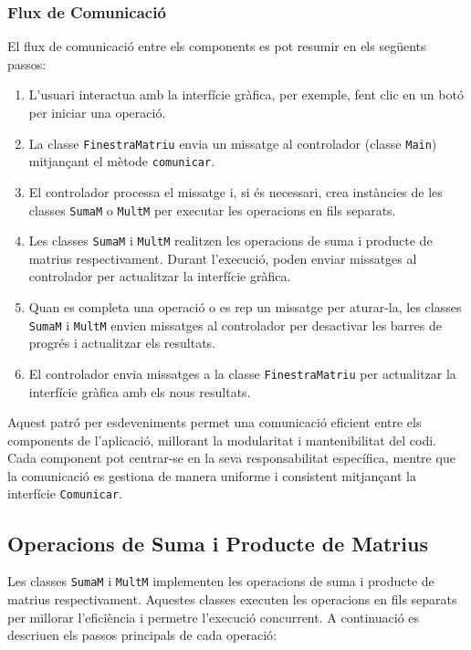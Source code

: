 \documentclass{ieeetj}
\begin{document}
\subsubsection{Flux de Comunicació}
El flux de comunicació entre els components es pot resumir en els següents passos:

\begin{enumerate}
    \item L'usuari interactua amb la interfície gràfica, per exemple, fent clic en un botó per iniciar una operació.
    \item La classe \texttt{FinestraMatriu} envia un missatge al controlador (classe \texttt{Main}) mitjançant el mètode \texttt{comunicar}.
    \item El controlador processa el missatge i, si és necessari, crea instàncies de les classes \texttt{SumaM} o \texttt{MultM} per executar les operacions en fils separats.
    \item Les classes \texttt{SumaM} i \texttt{MultM} realitzen les operacions de suma i producte de matrius respectivament. Durant l'execució, poden enviar missatges al controlador per actualitzar la interfície gràfica.
    \item Quan es completa una operació o es rep un missatge per aturar-la, les classes \texttt{SumaM} i \texttt{MultM} envien missatges al controlador per desactivar les barres de progrés i actualitzar els resultats.
    \item El controlador envia missatges a la classe \texttt{FinestraMatriu} per actualitzar la interfície gràfica amb els nous resultats.
\end{enumerate}

Aquest patró per esdeveniments permet una comunicació eficient entre els components de l'aplicació, millorant la modularitat i mantenibilitat del codi. Cada component pot centrar-se en la seva responsabilitat específica, mentre que la comunicació es gestiona de manera uniforme i consistent mitjançant la interfície \texttt{Comunicar}.

\subsection{Operacions de Suma i Producte de Matrius}
Les classes \texttt{SumaM} i \texttt{MultM} implementen les operacions de suma i producte de matrius respectivament. Aquestes classes executen les operacions en fils separats per millorar l'eficiència i permetre l'execució concurrent. A continuació es descriuen els passos principals de cada operació:
\end{document}

